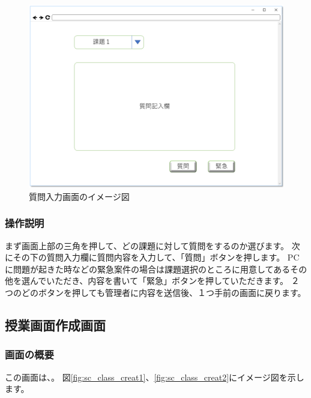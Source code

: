 \begin{figure}[htbp]
\begin{center}
  \includegraphics[width=1\linewidth,clip]{./img/sc_input_q.png}
  \caption{質問入力画面のイメージ図}\label{fig:sc_input_q}
\end{center}
\end{figure}

\subsubsection{操作説明}
まず画面上部の三角を押して、どの課題に対して質問をするのか選びます。
次にその下の質問入力欄に質問内容を入力して、「質問」ボタンを押します。
PCに問題が起きた時などの緊急案件の場合は課題選択のところに用意してあるその他を選んでいただき、内容を書いて「緊急」ボタンを押していただきます。
２つのどのボタンを押しても管理者に内容を送信後、１つ手前の画面に戻ります。

\newpage

\subsection{授業画面作成画面}
\subsubsection{画面の概要}
この画面は、。
図\ref{fig:sc_class_creat1}、\ref{fig:sc_class_creat2}にイメージ図を示します。

